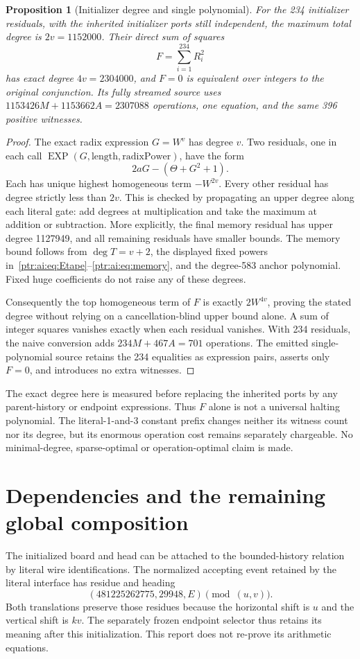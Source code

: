 \documentclass[11pt,letterpaper]{article}
\newtheorem{proposition}[theorem]{Proposition}
\theoremstyle{definition}\newtheorem{definition}[theorem]{Definition}
\theoremstyle{remark}\newtheorem{remark}[theorem]{Remark}
\newcommand{\EXP}{\operatorname{EXP}}\newcommand{\Raw}{\mathrm{Raw}}
\begin{document}
\begin{proposition}[Initializer degree and single polynomial]\label{ptr:ai:prop:initdegree}
For the 234 initializer residuals, with the inherited initializer ports still independent, the maximum total degree is $2v=1152000$. Their direct sum of squares
\[
 F=\sum_{i=1}^{234}R_i^2
\]
has exact degree $4v=2304000$, and $F=0$ is equivalent over integers to the original conjunction. Its fully streamed source uses $1153426M+1153662A=2307088$ operations, one equation, and the same 396 positive witnesses.
\end{proposition}
\begin{proof}
The exact radix expression $G=W^v$ has degree $v$. Two residuals, one in each call $\EXP(G,\text{length},\text{radixPower})$, have the form
\[
 2aG-(\Theta+G^2+1).
\]
Each has unique highest homogeneous term $-W^{2v}$. Every other residual has degree strictly less than $2v$. This is checked by propagating an upper degree along each literal gate: add degrees at multiplication and take the maximum at addition or subtraction. More explicitly, the final memory residual has upper degree 1127949, and all remaining residuals have smaller bounds. The memory bound follows from $\deg T=v+2$, the displayed fixed powers in~\eqref{ptr:ai:eq:Etape}--\eqref{ptr:ai:eq:memory}, and the degree-583 anchor polynomial. Fixed huge coefficients do not raise any of these degrees.

Consequently the top homogeneous term of $F$ is exactly $2W^{4v}$, proving the stated degree without relying on a cancellation-blind upper bound alone. A sum of integer squares vanishes exactly when each residual vanishes. With 234 residuals, the naive conversion adds $234M+467A=701$ operations. The emitted single-polynomial source retains the 234 equalities as expression pairs, asserts only $F=0$, and introduces no extra witnesses.
\end{proof}
The exact degree here is measured before replacing the inherited ports by any parent-history or endpoint expressions. Thus $F$ alone is not a universal halting polynomial. The literal-1-and-3 constant prefix changes neither its witness count nor its degree, but its enormous operation cost remains separately chargeable. No minimal-degree, sparse-optimal or operation-optimal claim is made.

\section{Dependencies and the remaining global composition}\label{ptr:ai:sec:scope}
The initialized board and head can be attached to the bounded-history relation by literal wire identifications. The normalized accepting event retained by the literal interface has residue and heading
\[
 (481225262775,29948,E)\pmod{(u,v)}.
\]
Both translations preserve those residues because the horizontal shift is $u$ and the vertical shift is $kv$. The separately frozen endpoint selector thus retains its meaning after this initialization. This report does not re-prove its arithmetic equations.
\end{document}
